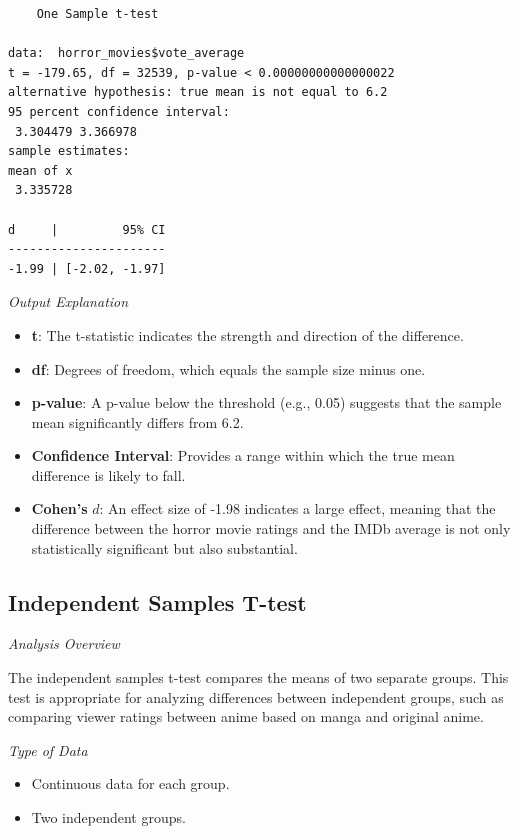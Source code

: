\documentclass[
]{book}
\providecommand{\tightlist}{%
  \setlength{\itemsep}{0pt}\setlength{\parskip}{0pt}}
\begin{document}
\begin{verbatim}
    One Sample t-test

data:  horror_movies$vote_average
t = -179.65, df = 32539, p-value < 0.00000000000000022
alternative hypothesis: true mean is not equal to 6.2
95 percent confidence interval:
 3.304479 3.366978
sample estimates:
mean of x 
 3.335728 

d     |         95% CI
----------------------
-1.99 | [-2.02, -1.97]
\end{verbatim}

\emph{Output Explanation}

\begin{itemize}
\tightlist
\item
  \textbf{t}: The t-statistic indicates the strength and direction of the difference.
\item
  \textbf{df}: Degrees of freedom, which equals the sample size minus one.
\item
  \textbf{p-value}: A p-value below the threshold (e.g., 0.05) suggests that the sample mean significantly differs from 6.2.
\item
  \textbf{Confidence Interval}: Provides a range within which the true mean difference is likely to fall.
\item
  \textbf{Cohen's} \(d\): An effect size of -1.98 indicates a large effect, meaning that the difference between the horror movie ratings and the IMDb average is not only statistically significant but also substantial.
\end{itemize}

\subsection*{Independent Samples T-test}\label{independent-samples-t-test}

\emph{Analysis Overview}

The independent samples t-test compares the means of two separate groups. This test is appropriate for analyzing differences between independent groups, such as comparing viewer ratings between anime based on manga and original anime.

\emph{Type of Data}

\begin{itemize}
\tightlist
\item
  Continuous data for each group.
\item
  Two independent groups.
\end{itemize}
\end{document}
